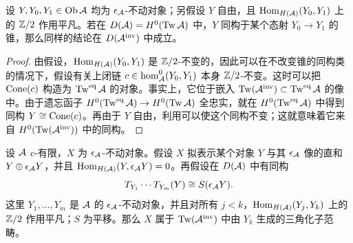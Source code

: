 \begin{lemma}\label{st:6.2}
设 $Y,Y_0,Y_1\in\operatorname{Ob}\mathcal A$ 均为 $\epsilon_{\mathcal A}$-不动对象；另假设 $Y$ 自由，且 $\operatorname{Hom}_{H(\mathcal A)}(Y_0,Y_1)$ 上的 $\mathbb Z/2$ 作用平凡。若在 $D(\mathcal A)=H^0(\operatorname{Tw}\mathcal A)$ 中，$Y$ 同构于某个态射 $Y_0\to Y_1$ 的锥，那么同样的结论在 $D(\mathcal A^{\mathrm{inv}})$ 中成立。
\end{lemma}
\begin{proof}
由假设，$\operatorname{Hom}_{H(\mathcal A)}(Y_0,Y_1)$ 是 $\mathbb Z/2$-不变的，因此可以在不改变锥的同构类的情况下，假设有关上闭链 $c\in\hom^0_{\mathcal A}(Y_0,Y_1)$ 本身 $\mathbb Z/2$-不变。这时可以把 $\operatorname{Cone}(c)$ 构造为 $\operatorname{Tw}^{\mathrm{eq}}\mathcal A$ 的对象。事实上，它位于嵌入 $\operatorname{Tw}(\mathcal A^{\mathrm{inv}})\subset\operatorname{Tw}^{\mathrm{eq}}\mathcal A$ 的像中。由于遗忘函子 $H^0(\operatorname{Tw}^{\mathrm{eq}}\mathcal A)\to H^0(\operatorname{Tw}\mathcal A)$ 全忠实，就在 $H^0(\operatorname{Tw}^{\mathrm{eq}}\mathcal A)$ 中得到同构 $Y\cong\operatorname{Cone}(c)$。再由于 $Y$ 自由，利用可以使这个同构不变；这就意味着它来自 $H^0(\operatorname{Tw}(\mathcal A^{\mathrm{inv}}))$ 中的同构。
\end{proof}
\begin{lemma}\label{st:6.3}
设 $\mathcal A$ c-有限，$X$ 为 $\epsilon_{\mathcal A}$-不动对象。假设 $X$ 拟表示某个对象 $Y$ 与其 $\epsilon_{\mathcal A}$ 像的直和 $Y\oplus\epsilon_{\mathcal A}Y$，并且 $\operatorname{Hom}_{H(\mathcal A)}(Y,\epsilon_{\mathcal A}Y)=0$。再假设在 $D(\mathcal A)$ 中有同构
\begin{equation}\label{eq:6.2}
T_{Y_1}\cdots T_{Y_m}(Y)\cong S(\epsilon_{\mathcal A}Y).
\end{equation}
这里 $Y_1,\ldots,Y_m$ 是 $\mathcal A$ 的 $\epsilon_{\mathcal A}$-不动对象，并且对所有 $j<k$，$\operatorname{Hom}_{H(\mathcal A)}(Y_j,Y_k)$ 上的 $\mathbb Z/2$ 作用平凡；$S$ 为平移。那么 $X$ 属于 $\operatorname{Tw}(\mathcal A^{\mathrm{inv}})$ 中由 $Y_k$ 生成的三角化子范畴。
\end{lemma}
